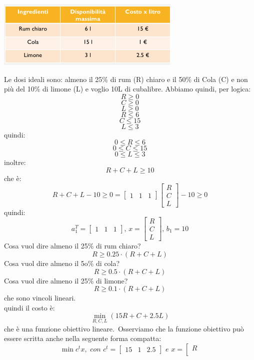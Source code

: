 \message{ !name(ro.tex)}\documentclass[a4paper,12pt, oneside]{book}
\begin{document}
\begin{esempio}
  \begin{center}
    \includegraphics[scale = 0.7]{img/cub.png}
  \end{center}
  Le dosi ideali sono: almeno il 25\% di rum (R) chiaro e il 50\% di
  Cola (C) e non più del 10\% di limone (L) e voglio 10L di cubalibre. Abbiamo quindi, per logica:
  \[R\geq 0\]
  \[C\geq 0\]
  \[L\geq 0\]
  \[R\leq 6\]
  \[C\leq 15\]
  \[L\leq 3\]
  quindi:
  \[0\leq R\leq 6\]
  \[0\leq C\leq 15\]
  \[0\leq L\leq 3\]
  inoltre:
  \[R+C+L\geq 10\]
  che è:
  \[R+C+L -10\geq 0 = \left[
      \begin{matrix}
        1 & 1 & 1
      \end{matrix}
    \right]\left[
      \begin{matrix}
        R \\
        C \\
        L
      \end{matrix}
    \right] -10 \geq 0\]
  quindi:
  \[a_1^T= \left[
      \begin{matrix}
        1 & 1 & 1
      \end{matrix}
    \right], \,x =\left[
      \begin{matrix}
        R \\
        C \\
        L
      \end{matrix}
    \right],\, b_1=10 \]
  Cosa vuol dire almeno il 25\% di rum chiaro?
  \[R \geq 0.25 \cdot (R + C + L)\]
  Cosa vuol dire almeno il 5o\% di cola?
  \[R \geq 0.5 \cdot (R + C + L)\]
  Cosa vuol dire almeno il 25\% di limone?
  \[R \geq 0.1\cdot (R + C + L)\]
  che sono vincoli lineari.\\
  quindi il costo è:
  \[\min_{R,C,L}(15R+C+2.5L)\]
  che è una funzione obiettivo lineare.\
  Osserviamo che la funzione obiettivo può essere scritta anche nella
  seguente forma compatta:
  \[\min c^tx,\,\,con\,\,c^t=\left[
      \begin{matrix}
        15 & 1 & 2.5
      \end{matrix}
    \right]\,\,e\,\, x =\left[
      \begin{matrix}
        R \\

\end{matrix}\]
\end{esempio}
\end{document}
